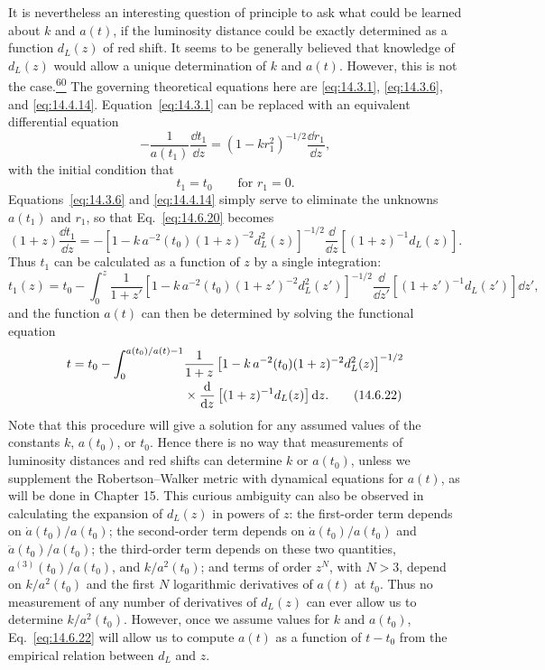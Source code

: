 It is nevertheless an interesting question of principle to ask what could be
learned about \(k\) and \(a(t)\), if the luminosity distance could be exactly
determined as a function \(d_L(z)\) of red shift. It seems to be generally
believed that knowledge of \(d_L(z)\) would allow a unique determination of
\(k\) and \(a(t)\). However, this is not the
case.\hyperref[ch14-ref-60]{\textsuperscript{60}} The governing theoretical
equations here are \eqref{eq:14.3.1}, \eqref{eq:14.3.6}, and
\eqref{eq:14.4.14}. Equation~\eqref{eq:14.3.1} can be replaced with an
equivalent differential equation
\begin{equation}
  -\frac{1}{a(t_1)}\frac{\dd t_1}{\dd z}
  =
  (1-kr_1^2)^{-1/2}\frac{\dd r_1}{\dd z},
  \tag{14.6.20}\label{eq:14.6.20}
\end{equation}
with the initial condition that
\begin{equation}
  t_1=t_0
  \qquad\text{for \(r_1=0\).}
  \tag{14.6.21}\label{eq:14.6.21}
\end{equation}
Equations~\eqref{eq:14.3.6} and \eqref{eq:14.4.14} simply serve to
eliminate the unknowns \(a(t_1)\) and \(r_1\), so that
Eq.~\eqref{eq:14.6.20} becomes
\[
  (1+z)\frac{\dd t_1}{\dd z}
  =
  -\left[
    1-k\,a^{-2}(t_0)(1+z)^{-2}d_L^2(z)
  \right]^{-1/2}
  \frac{\dd}{\dd z}
  \left[
    (1+z)^{-1}d_L(z)
  \right].
\]
Thus \(t_1\) can be calculated as a function of \(z\) by a single
integration:
\[
  t_1(z)
  =
  t_0
  -
  \int_0^z
  \frac{1}{1+z'}
  \left[
    1-k\,a^{-2}(t_0)(1+z')^{-2}d_L^2(z')
  \right]^{-1/2}
  \frac{\dd}{\dd z'}
  \left[
    (1+z')^{-1}d_L(z')
  \right]
  \dd z',
\]
and the function \(a(t)\) can then be determined by solving the functional
equation
\begin{align}
  t
  =
  t_0
  -
  \int_0^{a(t_0)/a(t)-1}
  &\frac{1}{1+z}
  \left[
    1-k\,a^{-2}(t_0)(1+z)^{-2}d_L^2(z)
  \right]^{-1/2}
  \notag\\[-2pt]
  &{}\times
  \frac{\mathop{}\!\mathrm{d}}{\mathop{}\!\mathrm{d} z}
  \left[
    (1+z)^{-1}d_L(z)
  \right]
  \mathop{}\!\mathrm{d} z.
  \tag{14.6.22}\label{eq:14.6.22}
\end{align}
Note that this procedure will give a solution for any assumed values of the
constants \(k\), \(a(t_0)\), or \(t_0\). Hence there is no way that
measurements of luminosity distances and red shifts can determine \(k\) or
\(a(t_0)\), unless we supplement the Robertson--Walker metric with
dynamical equations for \(a(t)\), as will be done in Chapter 15. This
curious ambiguity can also be observed in calculating the expansion of
\(d_L(z)\) in powers of \(z\): the first-order term depends on
\(\dot a(t_0)/a(t_0)\); the second-order term depends on
\(\dot a(t_0)/a(t_0)\) and \(\ddot a(t_0)/a(t_0)\); the third-order term
depends on these two quantities, \(a^{(3)}(t_0)/a(t_0)\), and
\(k/a^2(t_0)\); and terms of order \(z^N\), with \(N>3\), depend on
\(k/a^2(t_0)\) and the first \(N\) logarithmic derivatives of \(a(t)\) at
\(t_0\). Thus no measurement of any number of derivatives of \(d_L(z)\) can
ever allow us to determine \(k/a^2(t_0)\). However, once we assume values
for \(k\) and \(a(t_0)\), Eq.~\eqref{eq:14.6.22} will allow us to compute
\(a(t)\) as a function of \(t-t_0\) from the empirical relation between
\(d_L\) and \(z\).

